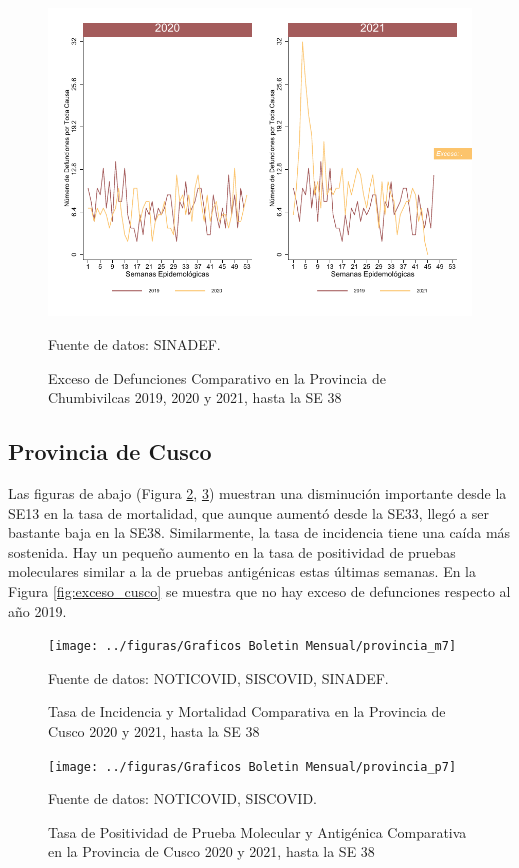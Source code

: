 \documentclass[12pt,a4paper,openany]{book}
\begin{document}
	\begin{figure}[h]
	\caption{Exceso de Defunciones Comparativo en la Provincia de Chumbivilcas 2019, 2020 y 2021, hasta la SE 38}\label{fig:exceso_chumbivilcas}
	\begin{center}
		\includegraphics[width=0.7\linewidth]{../figuras/exceso_6}
	\end{center}
	{\footnotesize {Fuente de datos: SINADEF.}}
	\end{figure}

\clearpage

	\subsection*{Provincia de Cusco}
	\noindent Las figuras de abajo (Figura \ref{fig:inc_mort_cusco}, \ref{fig:positividad_cusco})  muestran una disminución importante desde la SE13 en la tasa de mortalidad, que aunque aumentó desde la SE33, llegó a ser bastante baja en la SE38. Similarmente, la tasa de incidencia tiene una caída más sostenida. Hay un pequeño aumento en la tasa de positividad de pruebas moleculares similar a la de pruebas antigénicas estas últimas semanas. En la Figura \ref{fig:exceso_cusco} se muestra que no hay exceso de defunciones respecto al año 2019.

	\begin{figure}[h]
	\caption{Tasa de Incidencia y Mortalidad Comparativa en la Provincia de Cusco 2020 y 2021, hasta la SE 38}\label{fig:inc_mort_cusco}
	\begin{center}
		\texttt{[image: ../figuras/Graficos Boletin Mensual/provincia\_m7]}
	\end{center}
	{\footnotesize {Fuente de datos: NOTICOVID, SISCOVID, SINADEF.}}
	\end{figure}

	\begin{figure}[h]
	\caption{Tasa de Positividad de Prueba Molecular y Antigénica Comparativa en la Provincia de Cusco 2020 y 2021, hasta la SE 38}\label{fig:positividad_cusco}
	\begin{center}
		\texttt{[image: ../figuras/Graficos Boletin Mensual/provincia\_p7]}
	\end{center}
	{\footnotesize {Fuente de datos: NOTICOVID, SISCOVID.}}
	\end{figure}
\end{document}
